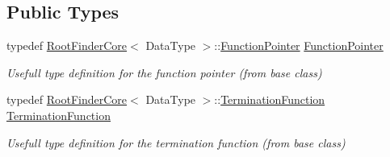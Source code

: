 \subsection*{Public Types}
\begin{DoxyCompactItemize}
\item 
typedef \hyperlink{classtudat_1_1root__finders_1_1RootFinderCore}{Root\+Finder\+Core}$<$ Data\+Type $>$\+::\hyperlink{classtudat_1_1root__finders_1_1NewtonRaphsonCore_a33d0c83c99670045066d67b92458757d}{Function\+Pointer} \hyperlink{classtudat_1_1root__finders_1_1NewtonRaphsonCore_a33d0c83c99670045066d67b92458757d}{Function\+Pointer}\hypertarget{classtudat_1_1root__finders_1_1NewtonRaphsonCore_a33d0c83c99670045066d67b92458757d}{}\label{classtudat_1_1root__finders_1_1NewtonRaphsonCore_a33d0c83c99670045066d67b92458757d}

\begin{DoxyCompactList}\small\item\em Usefull type definition for the function pointer (from base class) \end{DoxyCompactList}\item 
typedef \hyperlink{classtudat_1_1root__finders_1_1RootFinderCore}{Root\+Finder\+Core}$<$ Data\+Type $>$\+::\hyperlink{classtudat_1_1root__finders_1_1NewtonRaphsonCore_afcac89fdbf9dff9b8233cfa271edc19d}{Termination\+Function} \hyperlink{classtudat_1_1root__finders_1_1NewtonRaphsonCore_afcac89fdbf9dff9b8233cfa271edc19d}{Termination\+Function}\hypertarget{classtudat_1_1root__finders_1_1NewtonRaphsonCore_afcac89fdbf9dff9b8233cfa271edc19d}{}\label{classtudat_1_1root__finders_1_1NewtonRaphsonCore_afcac89fdbf9dff9b8233cfa271edc19d}

\begin{DoxyCompactList}\small\item\em Usefull type definition for the termination function (from base class) \end{DoxyCompactList}\end{DoxyCompactItemize}
